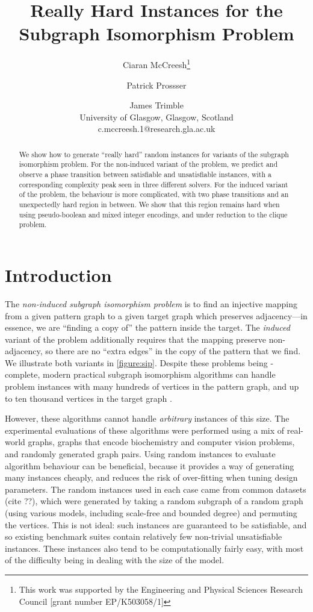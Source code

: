 \documentclass[letterpaper]{article}
\title{Really Hard Instances for the Subgraph Isomorphism Problem}
\author{Ciaran McCreesh\thanks{This work was supported by the Engineering and Physical Sciences
    Research Council [grant number EP/K503058/1]} \and Patrick Prossser \and James Trimble \\
University of Glasgow, Glasgow, Scotland \\
c.mccreesh.1@research.gla.ac.uk}
\begin{document}
\maketitle

\begin{abstract}
    We show how to generate ``really hard'' random instances for variants of the subgraph
    isomorphism problem. For the non-induced variant of the problem, we predict and observe a phase
    transition between satisfiable and unsatisfiable instances, with a corresponding complexity peak
    seen in three different solvers. For the induced variant of the problem, the behaviour is more
    complicated, with two phase transitions and an unexpectedly hard region in between. We show that
    this region remains hard when using pseudo-boolean and mixed integer encodings, and under
    reduction to the clique problem.
\end{abstract}

\section{Introduction}

The \emph{non-induced subgraph isomorphism problem} is to find an injective mapping from a given
pattern graph to a given target graph which preserves adjacency---in essence, we are ``finding a
copy of'' the pattern inside the target. The \emph{induced} variant of the problem additionally
requires that the mapping preserve non-adjacency, so there are no ``extra edges'' in the copy of the
pattern that we find. We illustrate both variants in \cref{figure:sip}.
Despite these problems being \NP-complete, modern practical subgraph isomorphism algorithms can
handle problem instances with many hundreds of vertices in the pattern graph, and up to ten thousand
vertices in the target graph \citep{Cordella:2004,Solnon:2010,Audemard:2014,McCreesh:2015}.

However, these algorithms cannot handle \emph{arbitrary} instances of this size. The experimental
evaluations of these algorithms were performed using a mix of real-world graphs, graphs that encode
biochemistry and computer vision problems, and randomly generated graph pairs. Using random
instances to evaluate algorithm behaviour can be beneficial, because it provides a way of generating
many instances cheaply, and reduces the risk of over-fitting when tuning design parameters. The
random instances used in each case came from common datasets (cite ??), which were generated by
taking a random subgraph of a random graph (using various models, including scale-free and bounded
degree) and permuting the vertices.  This is not ideal: such instances are guaranteed to be
satisfiable, and so existing benchmark suites contain relatively few non-trivial unsatisfiable
instances. These instances also tend to be computationally fairly easy, with most of the difficulty
being in dealing with the size of the model.
\end{document}
